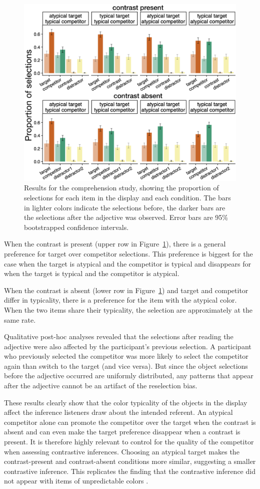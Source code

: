\documentclass[10pt,letterpaper]{article}
\begin{document}
\begin{figure}
	\begin{center}
		\includegraphics[width=.475\textwidth]{graphs/compr-results.pdf}
	\end{center}
\caption{Results for the comprehension study, showing the proportion of selections for each item in the display and each condition. The bars in lighter colors indicate the selections before, the darker bars are the selections after the adjective was observed. Error bars are 95\% bootstrapped confidence intervals.} 
\label{compr-results}
\end{figure}

When the contrast is present (upper row in Figure~\ref{compr-results}), there is a general preference for target over competitor selections. This preference is biggest for the case when the target is atypical and the competitor is typical and disappears for when the target is typical and the competitor is atypical. 

When the contrast is absent (lower row in Figure~\ref{compr-results}) and target and competitor differ in typicality, there is a preference for the item with the atypical color. When the two items share their typicality, the selection are approximately at the same rate. 

Qualitative post-hoc analyses revealed that the selections after reading the adjective were also affected by the participant's previous selection. A participant who previously selected the competitor was more likely to select the competitor again than switch to the target (and vice versa). But since the object selections before the adjective occurred are uniformly distributed, any patterns that appear after the adjective cannot be an artifact of the reselection bias.

These results clearly show that the color typicality of the objects in the display affect the inference listeners draw about the intended referent. An atypical competitor alone can promote the competitor over the target when the contrast is absent and can even make the target preference disappear when a contrast is present. It is therefore highly relevant to control for the quality of the competitor when assessing contrastive inferences. 
Choosing an atypical target makes the contrast-present and contrast-absent conditions more similar, suggesting a smaller contrastive inference. This replicates the finding that the contrastive inference did not appear with items of unpredictable colors \cite{Sedivy:2003}.
\end{document}
